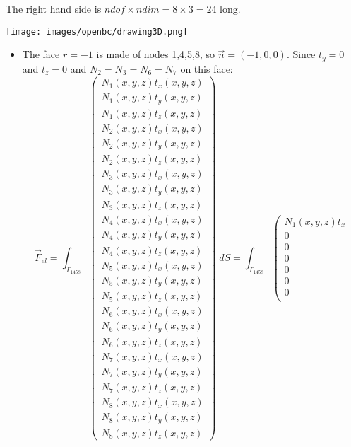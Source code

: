 The right hand side is $ndof \times ndim = 8\times 3 = 24$ long. 

\begin{center}
\texttt{[image: images/openbc/drawing3D.png]}
\end{center}

\begin{itemize}
\item The face $r=-1$ is made of nodes 1,4,5,8, so $\vec{n}=(-1,0,0)$.
Since $t_y=0$ and $t_z=0$ and $N_2=N_3=N_6=N_7$ on this face:
{\tiny
\[
\vec{F}_{el}=
\int_{\Gamma_{1458}} 
\left(
\begin{array}{c}
N_1(x,y,z) t_x(x,y,z)\\
N_1(x,y,z) t_y(x,y,z)\\
N_1(x,y,z) t_z(x,y,z)\\
N_2(x,y,z) t_x(x,y,z)\\
N_2(x,y,z) t_y(x,y,z)\\
N_2(x,y,z) t_z(x,y,z)\\
N_3(x,y,z) t_x(x,y,z)\\
N_3(x,y,z) t_y(x,y,z)\\
N_3(x,y,z) t_z(x,y,z)\\
N_4(x,y,z) t_x(x,y,z)\\
N_4(x,y,z) t_y(x,y,z)\\
N_4(x,y,z) t_z(x,y,z)\\
N_5(x,y,z) t_x(x,y,z)\\
N_5(x,y,z) t_y(x,y,z)\\
N_5(x,y,z) t_z(x,y,z)\\
N_6(x,y,z) t_x(x,y,z)\\
N_6(x,y,z) t_y(x,y,z)\\
N_6(x,y,z) t_z(x,y,z)\\
N_7(x,y,z) t_x(x,y,z)\\
N_7(x,y,z) t_y(x,y,z)\\
N_7(x,y,z) t_z(x,y,z)\\
N_8(x,y,z) t_x(x,y,z)\\
N_8(x,y,z) t_y(x,y,z)\\
N_8(x,y,z) t_z(x,y,z)
\end{array}
\right)
\; dS
=
\int_{\Gamma_{1458}} 
\left(
\begin{array}{c}
N_1(x,y,z) t_x\\
0 \\
0 \\
0\\
0\\
0\\
0\\

\end{array}\]}
\end{itemize}
